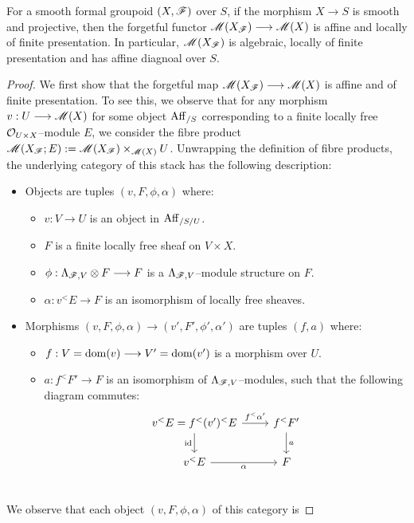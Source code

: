 \documentclass[11pt]{amsart}
\begin{document}
\begin{prop}\label{prop:mod-Lambda-forget-aff-loc-fp}
For a smooth formal groupoid $(X, \mathscr{F})$ over $S$, if the morphism
$X \to S$ is smooth and projective, then
the forgetful functor $\sM(X_\sF) \to \sM(X)$ is affine and locally of
  finite presentation.
In particular, $\mathscr{M}(X_\mathscr{F})$ is algebraic, locally of finite presentation and has
  affine diagnoal over $S$.
\end{prop}
\begin{proof}
We first show that the forgetful map $\sM(X_\sF) \to \sM(X)$ is affine and of
finite presentation. To see this, we observe that for any morphism
$v : U \to \sM(X)$ for some object $\mathrm{Aff}_{/S}$ corresponding to a finite locally
free $\mathcal{O}_{U \times X}$--module $E$,
we consider the fibre product $\mathscr{M}(X_\mathscr{F}; E) := \mathscr{M}(X_\mathscr{F}) \times_{\mathscr{M}(X)} U$.
Unwrapping the definition of fibre products, the underlying category
of this stack has the following description:
\begin{itemize}
\item Objects are tuples $(v, F, \phi, \alpha)$ where:
  \begin{itemize}
  \item $v : V \to U$ is an object in $\mathrm{Aff}_{/S/U}$.
  \item $F$ is a finite locally free sheaf on $V \times X$.
  \item $\phi : \Lambda_{\sF, V} \otimes F \to F$ is a $\Lambda_{\mathscr{F}, V}$--module
    structure on $F$.
  \item $\alpha : v^<E \to F$ is an isomorphism of locally free sheaves.
  \end{itemize}
\item Morphisms $(v, F, \phi, \alpha) \to (v', F', \phi', \alpha')$ are tuples
  $(f, a)$ where:
  \begin{itemize}
  \item $f : V = \dom(v) \to V' = \dom(v')$ is a morphism over $U$.
  \item $a : f^<F' \to F$ is an isomorphism of $\Lambda_{\mathscr{F}, V}$--modules, such
    that the following diagram commutes:
  \[\begin{tikzcd}
  v^<E = f^<(v')^<E \ar[r, "f^<\alpha'"] \ar[d, "\id" left] &
  f^<F' \ar[d, "a"] \\
  v^<E \ar[r, "\alpha" below] &
  F \\
  \end{tikzcd}\]
  \end{itemize}
\end{itemize}
We observe that each object $(v, F, \phi, \alpha)$ of this category is

\end{proof}
\end{document}
